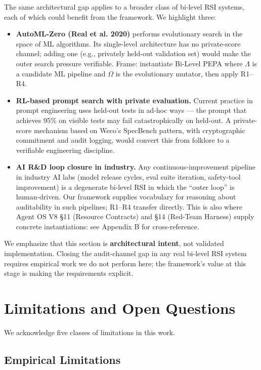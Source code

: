 \documentclass{article}
\theoremstyle{definition}
\begin{document}
The same architectural gap applies to a broader class of bi-level RSI systems, each of which could benefit from the framework. We highlight three:
\begin{itemize}
    \item \textbf{AutoML-Zero (Real et al. 2020)} performs evolutionary search in the space of ML algorithms. Its single-level architecture has no private-score channel; adding one (e.g., privately held-out validation set) would make the outer search pressure verifiable. Frame: instantiate Bi-Level PEPA where $\Lambda$ is a candidate ML pipeline and $\Omega$ is the evolutionary mutator, then apply R1--R4.
    \item \textbf{RL-based prompt search with private evaluation.} Current practice in prompt engineering uses held-out tests in ad-hoc ways --- the prompt that achieves 95\% on visible tests may fail catastrophically on held-out. A private-score mechanism based on Weco's SpecBench pattern, with cryptographic commitment and audit logging, would convert this from folklore to a verifiable engineering discipline.
    \item \textbf{AI R\&D loop closure in industry.} Any continuous-improvement pipeline in industry AI labs (model release cycles, eval suite iteration, safety-tool improvement) is a degenerate bi-level RSI in which the ``outer loop'' is human-driven. Our framework supplies vocabulary for reasoning about auditability in such pipelines; R1--R4 transfer directly. This is also where Agent OS V8 \S11 (Resource Contracts) and \S14 (Red-Team Harness) supply concrete instantiations: see Appendix B for cross-reference.
\end{itemize}

We emphasize that this section is \textbf{architectural intent}, not validated implementation. Closing the audit-channel gap in any real bi-level RSI system requires empirical work we do not perform here; the framework's value at this stage is making the requirements explicit.


\section{Limitations and Open Questions}

We acknowledge five classes of limitations in this work.

\subsection{Empirical Limitations}
\end{document}

